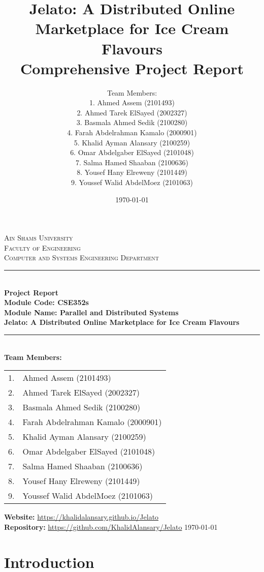 \documentclass[12pt,a4paper]{report}
\title{
    \vspace*{2cm}
    \Huge\bfseries Jelato: A Distributed Online Marketplace for Ice Cream Flavours\\[1.5em]
    \Large Comprehensive Project Report
}
\author{
    \Large Team Members:\\[0.5em]
    \normalsize
    1. Ahmed Assem (2101493)\\
    2. Ahmed Tarek ElSayed (2002327)\\
    3. Basmala Ahmed Sedik (2100280)\\
    4. Farah Abdelrahman Kamalo (2000901)\\
    5. Khalid Ayman Alansary (2100259)\\
    6. Omar Abdelgaber ElSayed (2101048)\\
    7. Salma Hamed Shaaban (2100636)\\
    8. Yousef Hany Elreweny (2101449)\\
    9. Youssef Walid AbdelMoez (2101063)
}
\date{\today}
\begin{document}
\begin{titlepage}
    \begin{center}
        \textsc{\Large Ain Shams University}\\[0.5em]
        \textsc{\large Faculty of Engineering}\\[0.5em]
        \textsc{\large Computer and Systems Engineering Department}\\[2.5em]
        \rule{\textwidth}{2pt}\\[2em]
        {\Huge \textbf{Project Report}}\\[1em]
        {\Large \textbf{Module Code: CSE352s}}\\
        {\Large \textbf{Module Name: Parallel and Distributed Systems}}\\[1em]
        {\LARGE \textbf{Jelato: A Distributed Online Marketplace for Ice Cream Flavours}}\\[2em]
        \rule{\textwidth}{2pt}\\[2.5em]
        \textbf{Team Members:}\\[1em]
        \begin{tabular}{ll}
            1. & Ahmed Assem (2101493) \\
            2. & Ahmed Tarek ElSayed (2002327) \\
            3. & Basmala Ahmed Sedik (2100280) \\
            4. & Farah Abdelrahman Kamalo (2000901) \\
            5. & Khalid Ayman Alansary (2100259) \\
            6. & Omar Abdelgaber ElSayed (2101048) \\
            7. & Salma Hamed Shaaban (2100636) \\
            8. & Yousef Hany Elreweny (2101449) \\
            9. & Youssef Walid AbdelMoez (2101063) \\
        \end{tabular}
        \vfill
        \textbf{Website:} \url{https://khalidalansary.github.io/Jelato}\\
        \textbf{Repository:} \url{https://github.com/KhalidAlansary/Jelato}
        \vfill
        \today
    \end{center}
\end{titlepage}

\tableofcontents
{}
\newpage

\chapter{Introduction}
\end{document}
